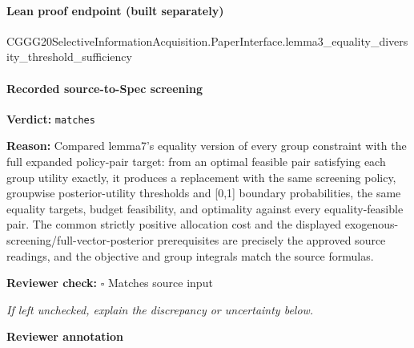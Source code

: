 \documentclass[10pt]{article}
\newcommand{\reviewerbox}{%
  \par\noindent\fbox{\parbox{0.96\linewidth}{\rule{0pt}{0.38in}}}\par
}
\newcommand{\reviewmatch}[1]{%
  \par\noindent\textbf{Reviewer check:} $\square$\; #1\par
  \noindent\emph{If left unchecked, explain the discrepancy or uncertainty below.}\par
}
\begin{document}
\paragraph{Lean proof endpoint (built separately)}\begin{ReviewVerbatim}
CGGG20SelectiveInformationAcquisition.PaperInterface.lemma3_equality_diversity_threshold_sufficiency
\end{ReviewVerbatim}

\paragraph{Recorded source-to-Spec screening}
\textbf{Verdict:} \texttt{matches}
\\
{\raggedright
\textbf{Reason:} Compared lemma7's equality version of every group constraint with the full expanded policy-\allowbreak{}pair target:\allowbreak{} from an optimal feasible pair satisfying each group utility exactly, it produces a replacement with the same screening policy, groupwise posterior-\allowbreak{}utility thresholds and [0,1] boundary probabilities, the same equality targets, budget feasibility, and optimality against every equality-\allowbreak{}feasible pair.\allowbreak{} The common strictly positive allocation cost and the displayed exogenous-\allowbreak{}screening/\allowbreak{}full-\allowbreak{}vector-\allowbreak{}posterior prerequisites are precisely the approved source readings, and the objective and group integrals match the source formulas.\allowbreak{}
\par}
\reviewmatch{Matches source input}
\noindent\textbf{Reviewer annotation}\par
\reviewerbox
\end{document}
